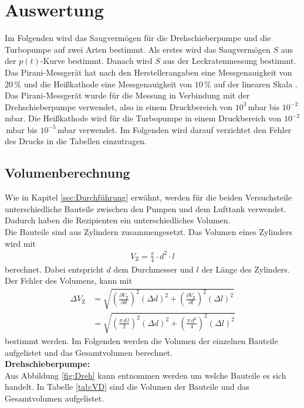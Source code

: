 \section{Auswertung}
\label{sec:Auswertung}
Im Folgenden wird das Saugvermögen für die Drehschieberpumpe und die Turbopumpe auf zwei Arten bestimmt. Als erstes wird das Saugvermögen $S$ aus der $p(t)$-Kurve bestimmt. Danach wird $S$ aus der Leckratenmessung bestimmt. \\
Das Pirani-Messgerät hat nach den Herstellerangaben eine Messgenauigkeit von $20\,\%$ und die Heißkathode eine Messgenauigkeit von $10\,\%$ auf der linearen Skala \cite{V70}. Das Pirani-Messgerät wurde für die Messung in Verbindung mit der Drehschieberpumpe verwendet, also in einem Druckbereich von $10^{3}$\,mbar bis $10^{-2}$\,mbar. Die Heißkathode wird für die Turbopumpe in einem Druckbereich von $10^{-2}$\,mbar bis $10^{-5}$\,mbar verwendet. Im Folgenden wird darauf verzichtet den Fehler des Drucks in die Tabellen einzutragen. \\



\subsection{Volumenberechnung}
Wie in Kapitel \eqref{sec:Durchführung} erwähnt, werden für die beiden Versuchsteile unterschiedliche Bauteile zwischen den Pumpen und dem Lufttank verwendet. Dadurch haben die Rezipienten ein unterschiedliches Volumen. \\
Die Bauteile sind aus Zylindern zusammengesetzt. Das Volumen eines Zylinders wird mit
\begin{align} \label{eqn:VZ}
  V_\text{Z} = \frac{\pi}{4} \cdot d^2 \cdot l
\end{align}
berechnet. Dabei entspricht $d$ dem Durchmesser und $l$ der Länge des Zylinders. Der Fehler des Volumens, kann mit
\begin{align} \label{eqn:DVZ}
  \Delta V_\text{Z} &= \sqrt{ \left(\frac{\partial V_\text{Z}}{\partial d}\right)^2 (\Delta d)^2 + \left(\frac{\partial V_\text{Z}}{\partial l}\right)^2 (\Delta l)^2 } \nonumber \\
  &= \sqrt{ \left(\frac{\pi\,d\,l}{2}\right)^2 (\Delta d)^2 + \left(\frac{\pi\,d^2}{4}\right)^2 (\Delta l)^2 }
\end{align}
bestimmt werden. Im Folgenden werden die Volumen der einzelnen Bauteile aufgelistet und das Gesamtvolumen berechnet. \\
\textbf{Drehschieberpumpe:} \\
Aus Abbildung \eqref{fig:Dreh} kann entnommen werden um welche Bauteile es sich handelt. In Tabelle \eqref{tab:VD} sind die Volumen der Bauteile und das Gesamtvolumen aufgelistet.

